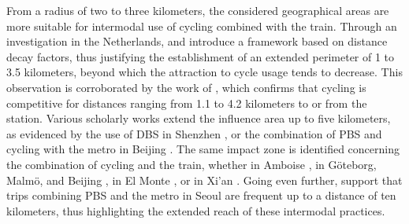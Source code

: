 \begin{refsegment}
From a radius of two to three kilometers, the considered geographical areas are more suitable for intermodal use of cycling combined with the train. Through an investigation in the Netherlands, \textcolor{blue}{\textcite[227]{keijer_how_2000}} and \textcolor{blue}{\textcite[73]{rietveld_accessibility_2000}} introduce a framework based on distance decay factors, thus justifying the establishment of an extended perimeter of 1 to 3.5 kilometers, beyond which the attraction to cycle usage tends to decrease. This observation is corroborated by the work of \textcolor{blue}{\textcite[281]{debrezion_modelling_2009}}, which confirms that cycling is competitive for distances ranging from 1.1 to 4.2 kilometers to or from the station. Various scholarly works extend the influence area up to five kilometers, as evidenced by the use of \acrshort{DBS} in Shenzhen \textcolor{blue}{\autocite[6]{wu_measuring_2019}}, or the combination of \acrshort{PBS} and cycling with the metro in Beijing \textcolor{blue}{\autocite[54]{zhao_bicycle-metro_2017}}. The same impact zone is identified concerning the combination of cycling and the train, whether in Amboise \textcolor{blue}{\autocite[751]{midenet_modal_2018}}, in Göteborg, Malmö, and Beijing \textcolor{blue}{\autocite[15]{hamidi_shaping_2020}}, in El Monte \textcolor{blue}{\autocite[118]{cottrell_transforming_2007}}, or in Xi'an \textcolor{blue}{\autocite[172]{yang_bike-and-ride_2014}}. Going even further, \textcolor{blue}{\textcite[9]{kim_analysis_2021}} support that trips combining \acrshort{PBS} and the metro in Seoul are frequent up to a distance of ten kilometers, thus highlighting the extended reach of these intermodal practices.%


\end{refsegment}
